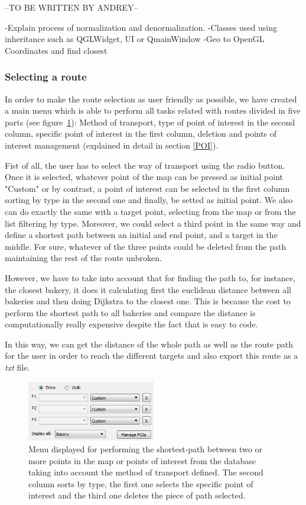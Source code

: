 \documentclass{article}
\begin{document}
--TO BE WRITTEN BY ANDREY--

-Explain process of normalization and denormalization.
-Classes used using inheritance such as QGLWidget, UI or QmainWindow
-Geo to OpenGL Coordinates and find closest

\subsubsection{Selecting a route}
In order to make the route selection as user friendly as possible, we have created a main menu which is able to perform all tasks related with routes divided in five parts (see figure~\ref{fig:menu_poi}): Method of transport, type of point of interest in the second column, specific point of interest in the first column, deletion and points of interest management (explained in detail in section \ref{POI}).

Fist of all, the user has to select the way of transport using the radio button. Once it is selected, whatever point of the map can be pressed as initial point "Custom" or by contrast, a point of interest can be selected in the first column sorting by type in the second one and finally, be setted as initial point. We also can do exactly the same with a target point, selecting from the map or from the list filtering by type. Moreover, we could select a third point in the same way and define a shortest path between an initial and end point, and a target in the middle. For sure, whatever of the three points could be deleted from the path maintaining the rest of the route unbroken.

However, we have to take into account that for finding the path to, for instance, the closest bakery, it does it calculating first the euclidean distance between all bakeries and then doing Dijkstra to the closest one. This is because the cost to perform the shortest path to all bakeries and compare the distance is computationally really expensive despite the fact that is easy to code.

In this way, we can get the distance of the whole path as well as the route path for the user in order to reach the different targets and also export this route as a \textit{txt} file.

\begin{figure}[h]
\centering
\includegraphics[width=0.5\textwidth]{menu_points.png}
\caption{Menu displayed for performing the shortest-path between two or more points in the map or points of interest from the database taking into account the method of transport defined. The second column sorts by type, the first one selects the specific point of interest and the third one deletes the piece of path selected.}
\label{fig:menu_poi}
\end{figure}
\end{document}
